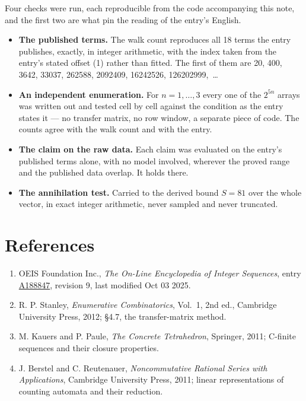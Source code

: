 \documentclass[11pt]{article}
\theoremstyle{definition}
\begin{document}
Four checks were run, each reproducible from the code accompanying this note, and the first two are what pin the reading of the entry's English.

\begin{itemize}

\item {\bfseries The published terms.} The walk count reproduces all 18 terms the entry publishes, exactly, in integer arithmetic, with the index taken from the entry's stated offset (1) rather than fitted. The first of them are 20, 400, 3642, 33037, 262588, 2092409, 16242526, 126202999,~\dots

\item {\bfseries An independent enumeration.} For $n = 1,\dots,3$ every one of the $2^{5n}$ arrays was written out and tested cell by cell against the condition as the entry states it --- no transfer matrix, no row window, a separate piece of code. The counts agree with the walk count and with the entry.

\item {\bfseries The claim on the raw data.} Each claim was evaluated on the entry's published terms alone, with no model involved, wherever the proved range and the published data overlap. It holds there.

\item {\bfseries The annihilation test.} Carried to the derived bound $S = 81$ over the whole vector, in exact integer arithmetic, never sampled and never truncated.

\end{itemize}

\section{References}

\begin{enumerate}

\item OEIS Foundation Inc., \emph{The On-Line Encyclopedia of Integer Sequences}, entry \href{https://oeis.org/A188847}{A188847}, revision 9, last modified Oct 03 2025.

\item R. P. Stanley, \emph{Enumerative Combinatorics}, Vol.~1, 2nd ed., Cambridge University Press, 2012; \S4.7, the transfer-matrix method.

\item M. Kauers and P. Paule, \emph{The Concrete Tetrahedron}, Springer, 2011; C-finite sequences and their closure properties.

\item J. Berstel and C. Reutenauer, \emph{Noncommutative Rational Series with Applications}, Cambridge University Press, 2011; linear representations of counting automata and their reduction.

\end{enumerate}
\end{document}
